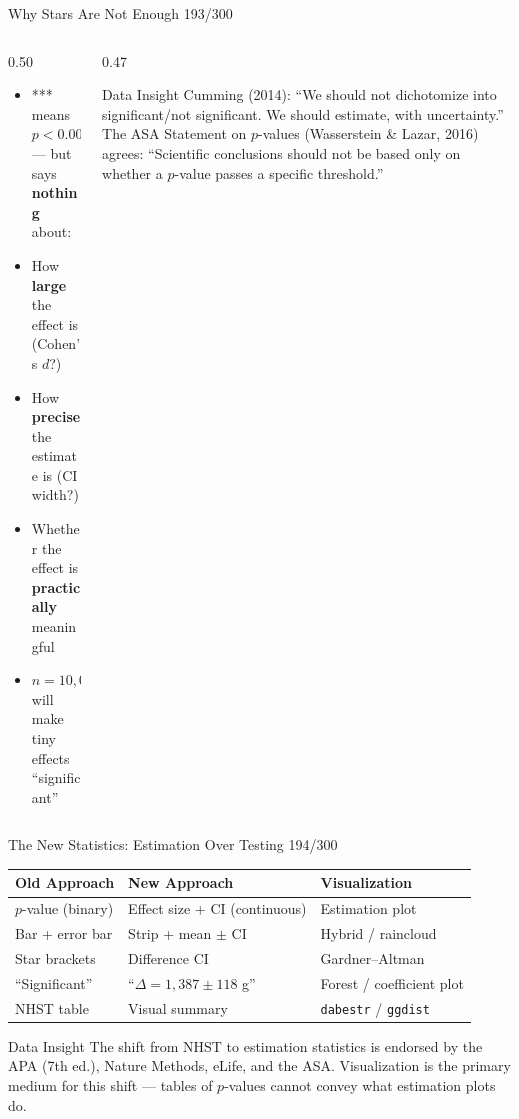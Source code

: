 \documentclass[10pt]{beamer}
\newcommand{\smark}[1]{\hfill{\scriptsize\color{codegray}#1}}
\begin{document}
\begin{frame}{Why Stars Are Not Enough}
\smark{193/300}
\begin{columns}[T]
\begin{column}{0.50\textwidth}
\begin{itemize}
    \item *** means $p < 0.001$ --- but says \textbf{nothing} about:
    \item How \textbf{large} the effect is (Cohen's $d$?)
    \item How \textbf{precise} the estimate is (CI width?)
    \item Whether the effect is \textbf{practically} meaningful
    \item $n = 10{,}000$ will make tiny effects ``significant''
\end{itemize}
\end{column}
\begin{column}{0.47\textwidth}
\begin{exampleblock}{Data Insight}
    \scriptsize Cumming (2014): ``We should not dichotomize into significant/not significant. We should estimate, with uncertainty.'' The ASA Statement on $p$-values (Wasserstein \& Lazar, 2016) agrees: ``Scientific conclusions should not be based only on whether a $p$-value passes a specific threshold.''
\end{exampleblock}
\end{column}
\end{columns}
\end{frame}

\begin{frame}{The New Statistics: Estimation Over Testing}
\smark{194/300}
\centering\small
\begin{tabular}{@{}lll@{}}
    \toprule
    \textbf{Old Approach} & \textbf{New Approach} & \textbf{Visualization} \\
    \midrule
    $p$-value (binary)    & Effect size + CI (continuous) & Estimation plot \\
    Bar + error bar       & Strip + mean $\pm$ CI         & Hybrid / raincloud \\
    Star brackets         & Difference CI                 & Gardner--Altman \\
    ``Significant''       & ``$\Delta = 1{,}387 \pm 118$ g''   & Forest / coefficient plot \\
    NHST table            & Visual summary                & \texttt{dabestr} / \texttt{ggdist} \\
    \bottomrule
\end{tabular}

\vspace{0.3cm}
\begin{exampleblock}{Data Insight}
    \scriptsize The shift from NHST to estimation statistics is endorsed by the APA (7th ed.), Nature Methods, eLife, and the ASA. Visualization is the primary medium for this shift --- tables of $p$-values cannot convey what estimation plots do.
\end{exampleblock}
\end{frame}
\end{document}
